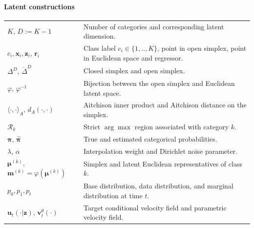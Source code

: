\newpage
\paragraph{Latent constructions}
\begin{center}
\renewcommand{\arraystretch}{1.15}
\begin{tabular}{p{}p{}}
$K$, $D:=K-1$ & Number of categories and corresponding latent dimension. \\
$c_i, \boldsymbol{x}_i, \boldsymbol{z}_i$, $\boldsymbol{r}_i$ & Class label $c_i\in \{1,..,K\}$, point in open simplex, point in Euclidean space and regressor. \\
$\Delta^{D}$, $\mathring{\Delta}^{D}$ & Closed simplex and open simplex. \\
$\varphi$, $\varphi^{-1}$ & Bijection between the open simplex and Euclidean latent space. \\
$\langle\cdot,\cdot\rangle_A$, $d_A(\cdot,\cdot)$ & Aitchison inner product and Aitchison distance on the simplex. \\
$\mathcal{R}_k$ & Strict $\arg\max$ region associated with category $k$. \\
$\boldsymbol{\pi}$, $\hat{\boldsymbol{\pi}}$ & True and estimated categorical probabilities. \\
$\lambda$, $\alpha$ & Interpolation weight and Dirichlet noise parameter. \\
$\boldsymbol{\mu}^{(k)}$, $\boldsymbol{m}^{(k)}=\varphi(\boldsymbol{\mu}^{(k)})$ & Simplex and latent Euclidean representatives of class $k$. \\
$p_0,p_1,p_t$ & Base distribution, data distribution, and marginal distribution at time $t$. \\
$\boldsymbol{u}_t(\cdot|\boldsymbol{z})$, $\boldsymbol{v}_t^{\theta}(\cdot)$ & Target conditional velocity field and parametric velocity field.  
\end{tabular}
\end{center}
